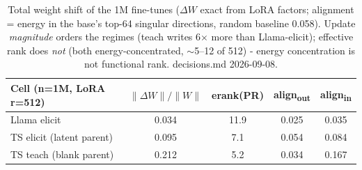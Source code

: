 \begin{table}[t]
\centering
\begin{tabular}{lcccc}
\hline
Cell (n=1M, LoRA r=512) & $\|\Delta W\|/\|W\|$ & erank(PR) & align\textsubscript{out} & align\textsubscript{in} \\
\hline
Llama elicit & 0.034 & 11.9 & 0.025 & 0.035 \\
TS elicit (latent parent) & 0.095 & 7.1 & 0.054 & 0.084 \\
TS teach (blank parent) & 0.212 & 5.2 & 0.034 & 0.167 \\
\hline
\end{tabular}
\caption{Total weight shift of the 1M fine-tunes ($\Delta W$ exact from LoRA factors; alignment = energy in the base's top-64 singular directions, random baseline 0.058). Update \emph{magnitude} orders the regimes (teach writes 6$\times$ more than Llama-elicit); effective rank does \emph{not} (both energy-concentrated, $\sim$5--12 of 512) - energy concentration is not functional rank. decisions.md 2026-09-08.}
\label{tab:weight_shift}
\end{table}
